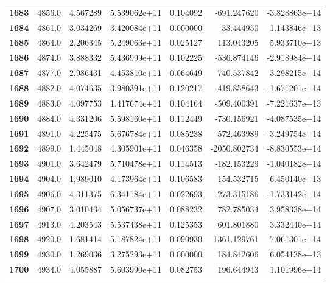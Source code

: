 \documentclass{report}[12pt]
\begin{document}
\begin{center}
\begin{tabular}{lrrrrrr}
\textbf{1683} &         4856.0 &   4.567289 &  5.539062e+11 &    0.104092 &  -691.247620 & -3.828863e+14 \\
\textbf{1684} &         4861.0 &   3.034269 &  3.420084e+11 &    0.000000 &    33.444950 &  1.143846e+13 \\
\textbf{1685} &         4864.0 &   2.206345 &  5.249063e+11 &    0.025127 &   113.043205 &  5.933710e+13 \\
\textbf{1686} &         4874.0 &   3.888332 &  5.436999e+11 &    0.102225 &  -536.874146 & -2.918984e+14 \\
\textbf{1687} &         4877.0 &   2.986431 &  4.453810e+11 &    0.064649 &   740.537842 &  3.298215e+14 \\
\textbf{1688} &         4882.0 &   4.074635 &  3.980391e+11 &    0.120217 &  -419.858643 & -1.671201e+14 \\
\textbf{1689} &         4883.0 &   4.097753 &  1.417674e+11 &    0.104164 &  -509.400391 & -7.221637e+13 \\
\textbf{1690} &         4884.0 &   4.331206 &  5.598160e+11 &    0.112449 &  -730.156921 & -4.087535e+14 \\
\textbf{1691} &         4891.0 &   4.225475 &  5.676784e+11 &    0.085238 &  -572.463989 & -3.249754e+14 \\
\textbf{1692} &         4899.0 &   1.445048 &  4.305901e+11 &    0.046358 & -2050.802734 & -8.830553e+14 \\
\textbf{1693} &         4901.0 &   3.642479 &  5.710478e+11 &    0.114513 &  -182.153229 & -1.040182e+14 \\
\textbf{1694} &         4904.0 &   1.989010 &  4.173964e+11 &    0.106583 &   154.532715 &  6.450140e+13 \\
\textbf{1695} &         4906.0 &   4.311375 &  6.341184e+11 &    0.022693 &  -273.315186 & -1.733142e+14 \\
\textbf{1696} &         4907.0 &   3.010434 &  5.056737e+11 &    0.088232 &   782.785034 &  3.958338e+14 \\
\textbf{1697} &         4913.0 &   4.203543 &  5.537438e+11 &    0.125353 &   601.801880 &  3.332440e+14 \\
\textbf{1698} &         4920.0 &   1.681414 &  5.187824e+11 &    0.090930 &  1361.129761 &  7.061301e+14 \\
\textbf{1699} &         4930.0 &   1.269036 &  3.275293e+11 &    0.000000 &   184.842606 &  6.054138e+13 \\
\textbf{1700} &         4934.0 &   4.055887 &  5.603990e+11 &    0.082753 &   196.644943 &  1.101996e+14 \\

\end{tabular}
\end{center}
\end{document}
